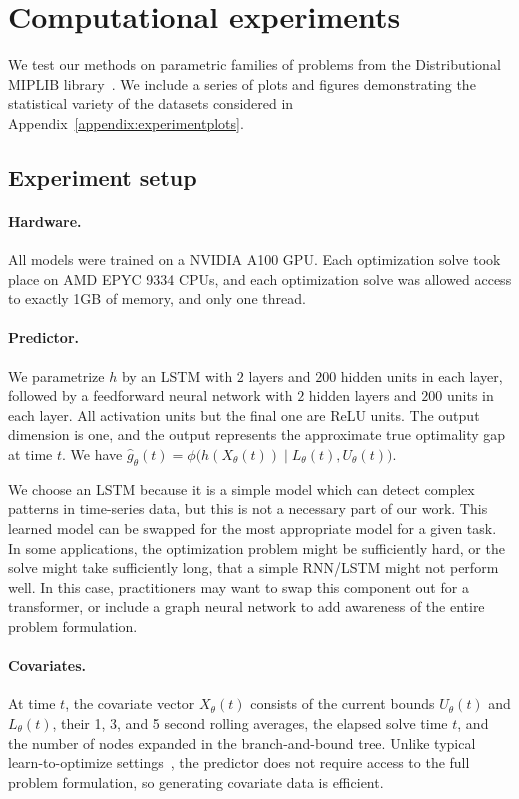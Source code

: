 \documentclass[12pt]{article}
\renewcommand{\cite}[1]{\citep{#1}}
\theoremstyle{definition}
\theoremstyle{remark}
\newcommand{\param}{\theta}
\newcommand{\UB}{U}
\newcommand{\LB}{L}
\newcommand{\covars}{X}
\newcommand{\nn}{h}
\newcommand{\activ}{\phi}
\newcommand{\predgap}{\hat{g}}
\newcommand{\LSTMLAYERS}{2}
\newcommand{\LSTMHIDDEN}{200}
\newcommand{\FFLAYERS}{2}
\newcommand{\FFHIDDEN}{200}
\newcommand{\change}[1]{#1}
\newcommand{\param}{\theta}
\newcommand{\UB}{U}
\newcommand{\LB}{L}
\newcommand{\covars}{X}
\newcommand{\nn}{h}
\newcommand{\activ}{\phi}
\newcommand{\predgap}{\hat{g}}
\newcommand{\LSTMLAYERS}{2}
\newcommand{\LSTMHIDDEN}{200}
\newcommand{\FFLAYERS}{2}
\newcommand{\FFHIDDEN}{200}
\newcommand{\change}[1]{#1}
\theoremstyle{plain}
\theoremstyle{definition}
\theoremstyle{remark}
\begin{document}
\section{Computational experiments}
We test our methods on parametric families of problems from the Distributional MIPLIB library~\cite{Huang2024DistributionalMA}.
\change{We include a series of plots and figures demonstrating the statistical variety of the datasets considered in Appendix~\ref{appendix:experimentplots}.}
\subsection{Experiment setup}
\paragraph{Hardware.} All models were trained on a NVIDIA A100 GPU.
Each optimization solve took place on AMD EPYC 9334 CPUs, and each optimization solve was allowed access to exactly 1GB of memory, and only one thread.
\paragraph{Predictor.} We parametrize $\nn$ by an LSTM with $\LSTMLAYERS$ layers and $\LSTMHIDDEN$ hidden units in each layer, followed by a feedforward neural network with $\FFLAYERS$ hidden layers and $\FFHIDDEN$ units in each layer.
All activation units but the final one are ReLU units.
The output dimension is one, and the output represents the approximate true optimality gap at time $t$.
We have $\predgap_\param(t) = \activ\big(\nn(\covars_\param(t)) \mid \LB_\param(t), \UB_\param(t)\big)$.
\change{
    We choose an LSTM because it is a simple model which can detect complex patterns in time-series data, but this is not a necessary part of our work. This learned model can be swapped for the most appropriate model for a given task.
    In some applications, the optimization problem might be sufficiently hard, or the solve might take sufficiently long, that a simple RNN/LSTM might not perform well. 
    In this case, practitioners may want to swap this component out for a transformer, or include a graph neural network to add awareness of the entire problem formulation.
}
\paragraph{Covariates.} At time $t$, the covariate vector $\covars_\param(t)$ consists of the current bounds $\UB_\param(t)$ and $\LB_\param(t)$, their 1, 3, and 5 second rolling averages, the elapsed solve time $t$, and the number of nodes expanded in the branch-and-bound tree.
Unlike typical learn-to-optimize settings~\cite{Scavuzzo2022LearningTB}, the predictor does not require access to the full problem formulation, so generating covariate data is efficient.
\end{document}
